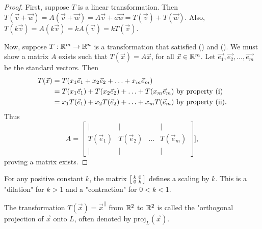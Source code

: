 \documentclass[a4paper,11pt]{article}
\begin{document}
\begin{outline}
    \begin{proof}
      \forward
        First, suppose \(T\) is a linear transformation. Then \(T(\vec{v} + \vec{w}) = A(\vec{v} + \vec{w})
        = A\vec{v} + a\vec{w} = T(\vec{v}) + T(\vec{w})\). Also, \(T(k\vec{v}) = A(k\vec{v}) = kA(\vec{v}) 
        = kT(\vec{v})\).
        
      \backward
        Now, suppose \(T: \mathbb{R}^m \rightarrow \mathbb{R}^n\) is a transformation that satisfied
        () and (). We must show a matrix \(A\) exists such that 
        \(T(\vec{x}) = A\vec{x}\), for all \(\vec{x} \in \mathbb{R}^m\). Let \(\vec{e_1}, \vec{e_2}, 
        \ldots, \vec{e_m}\) be the standard vectors. Then
        \begin{align*}
          T(\vec{x}) &= T(x_1\vec{e}_1 + x_2\vec{e}_2 + \ldots + x_m\vec{e}_m)\\
                     &= T(x_1\vec{e}_1) + T(x_2\vec{e}_2) + \ldots + T(x_m\vec{e}_m) 
                        \text{ by property (\romannumeral 1)}\\
                     &= x_1T(\vec{e}_1) + x_2T(\vec{e}_2) + \ldots + x_mT(\vec{e}_m) 
                        \text{ by property (\romannumeral 2).}
        \end{align*}
        Thus 
        \[ A = \begin{bmatrix}
          \vert        & \vert        &        & \vert       \\
          T(\vec{e}_1) & T(\vec{e}_2) & \ldots & T(\vec{e}_m)\\
          \vert        & \vert        &        & \vert       \end{bmatrix}], 
        \] proving a matrix exists.
    \end{proof}
    
  
    
    For any positive constant \(k\), the matrix \(\begin{bsmallmatrix} k&0\\ 0&k \end{bsmallmatrix}\) defines
    a scaling by \(k\). This is a "dilation" for \(k > 1\) and a "contraction" for \(0 < k < 1\).
    
    The transformation \(T(\vec{x}) = \vec{x}^{\parallel}\) from \(\mathbb{R}^2\) to \(\mathbb{R}^2\)
    is called the "orthogonal projection of \(\vec{x}\) onto \(L\), often denoted by \(\text{proj}_{L}(\vec{x})\).
    

\end{outline}
\end{document}
